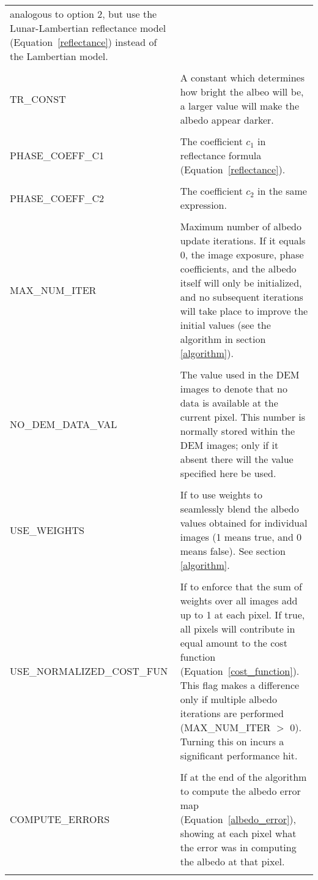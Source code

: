\documentclass[letterpaper,fleqn,11pt]{report}
\begin{document}
\begin{longtable}{ l p{7cm} }
analogous to option 2, but use the Lunar-Lambertian reflectance model (Equation~\ref{reflectance})
instead of the Lambertian model.\\
\\
TR\_CONST & A constant which determines how bright the albeo will be, a larger value will make the albedo 
appear darker. \\
\\
PHASE\_COEFF\_C1  & The coefficient $c_1$ in reflectance formula (Equation~\ref{reflectance}).\\
\\
PHASE\_COEFF\_C2  & The coefficient $c_2$ in the same expression.\\
\\
MAX\_NUM\_ITER     &
Maximum number of albedo update iterations. If it equals 0, the image
exposure, phase coefficients, and the albedo itself will only be
initialized, and no subsequent iterations will take place to improve
the initial values (see the algorithm in section \ref{algorithm}).\\ 
\\
NO\_DEM\_DATA\_VAL &
The value used in the DEM images to denote that no data is available at the
current pixel. This number is normally stored within the DEM images;
only if it absent there will the value specified here be used.\\
\\
USE\_WEIGHTS &
 If to use weights to seamlessly blend the albedo values obtained for
 individual images (1 means true, and 0 means false). See section \ref{algorithm}.\\
\\
USE\_NORMALIZED\_COST\_FUN &
 If to enforce that the sum of weights over all images add up to 1 at
 each pixel.  If true, all pixels will contribute in equal amount to
 the cost function (Equation~\ref{cost_function}). This flag makes a difference only if multiple
 albedo iterations are performed (MAX\_NUM\_ITER $>$ 0). Turning this
 on incurs a significant performance hit.\\
\\
COMPUTE\_ERRORS   &
 If at the end of the algorithm to compute the albedo error map (Equation~\ref{albedo_error}), showing at each pixel what the error was in computing the albedo at that pixel.\\
\\

\end{longtable}
\end{document}

